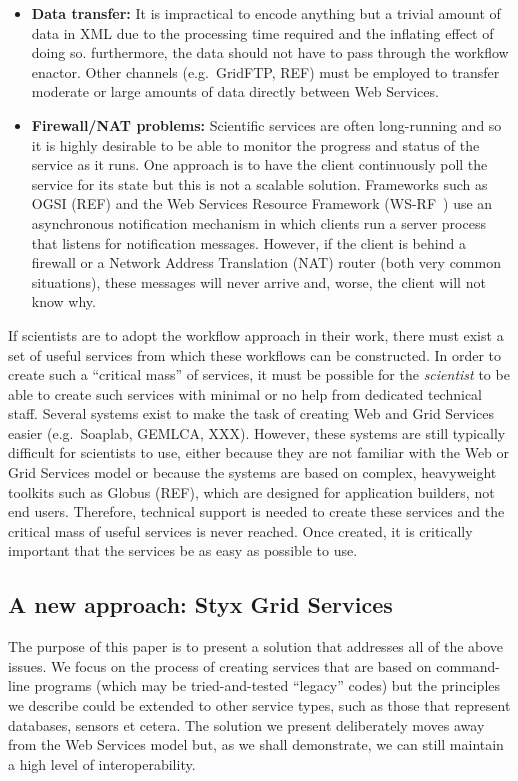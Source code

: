 \documentclass{llncs}
\begin{document}
\begin{itemize}
	\item {\bf Data transfer:} It is impractical to encode anything but a trivial amount of data in XML due to the processing time required and the inflating effect of doing so.  furthermore, the data should not have to pass through the workflow enactor.  Other channels (e.g.\ GridFTP, REF) must be employed to transfer moderate or large amounts of data directly between Web Services.
	\item {\bf Firewall/NAT problems:} Scientific services are often long-running and so it is highly desirable to be able to monitor the progress and status of the service as it runs.  One approach is to have the client continuously poll the service for its state but this is not a scalable solution.  Frameworks such as OGSI (REF) and the Web Services Resource Framework (WS-RF~\cite{wsrf}) use an asynchronous notification mechanism in which clients run a server process that listens for notification messages.  However, if the client is behind a firewall or a Network Address Translation (NAT) router (both very common situations), these messages will never arrive and, worse, the client will not know why.
\end{itemize}

If scientists are to adopt the workflow approach in their work, there must exist a set of useful services from which these workflows can be constructed.  In order to create such a ``critical mass'' of services, it must be possible for the {\em scientist\/} to be able to create such services with minimal or no help from dedicated technical staff.  Several systems exist to make the task of creating Web and Grid Services easier (e.g.\ Soaplab, GEMLCA, XXX).  However, these systems are still typically difficult for scientists to use, either because they are not familiar with the Web or Grid Services model or because the systems are based on complex, heavyweight toolkits such as Globus (REF), which are designed for application builders, not end users.  Therefore, technical support is needed to create these services and the critical mass of useful services is never reached.  Once created, it is critically important that the services be as easy as possible to use.

\subsection{A new approach: Styx Grid Services}
The purpose of this paper is to present a solution that addresses all of the above issues.  We focus on the process of creating services that are based on command-line programs (which may be tried-and-tested ``legacy'' codes) but the principles we describe could be extended to other service types, such as those that represent databases, sensors et cetera.  The solution we present deliberately moves away from the Web Services model but, as we shall demonstrate, we can still maintain a high level of interoperability.
\end{document}
